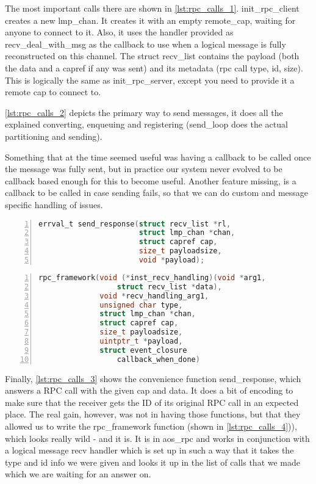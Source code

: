 The most important calls there are shown in \autoref{lst:rpc_calls_1}.
init\_rpc\_client creates a new lmp\_chan. It 
creates it with an empty remote\_cap, waiting for anyone to connect to it. 
Also, it uses the handler provided as recv\_deal\_with\_msg as the callback to 
use when a logical message is fully reconstructed on this channel. The struct 
recv\_list contains the payload (both the data and a capref if any was sent) 
and its metadata (rpc call type, id, size).
This is logically the same as init\_rpc\_server, except you need to provide 
it a remote cap to connect to.
\medskip

\autoref{lst:rpc_calls_2} depicts the primary way to send messages, it does 
all the explained converting, enqueuing and registering (send\_loop does the 
actual partitioning and sending).
\medskip

Something that at the time seemed useful was having a callback to be called 
once the message was fully sent, but in practice our system never evolved to 
be callback based enough for this to become useful. 
Another feature missing, is a callback to be called in case sending fails, so 
that we can do custom and message specific handling of issues.
\medskip

\begin{lstlisting}[caption={RPC send\_response}, 
label=lst:rpc_calls_3, numbers=left, stepnumber=1, float, floatplacement=tl, 
frame=tb, language=c]
errval_t send_response(struct recv_list *rl, 
                       struct lmp_chan *chan,
                       struct capref cap, 
                       size_t payloadsize, 
                       void *payload);
\end{lstlisting}
\begin{lstlisting}[caption={rpc\_framework}, 
label=lst:rpc_calls_4, numbers=left, stepnumber=1, float, floatplacement=tl, 
frame=tb, language=c]
rpc_framework(void (*inst_recv_handling)(void *arg1, 
                  struct recv_list *data),
              void *recv_handling_arg1,
              unsigned char type,
              struct lmp_chan *chan, 
              struct capref cap, 
              size_t payloadsize, 
              uintptr_t *payload,
              struct event_closure 
                  callback_when_done)
\end{lstlisting}

Finally, \autoref{lst:rpc_calls_3} shows the convenience function 
send\_response, which answers a RPC call with the given cap and data. It does 
a bit of encoding to make sure that the receiver gets the ID of its original 
RPC call in an expected place.
The real gain, however, was not in having those functions, but that they 
allowed us to write the rpc\_framework function (shown in 
\autoref{lst:rpc_calls_4})), which looks really wild - and it is. 
It is in aos\_rpc and works in conjunction with a logical message recv handler 
which is set up in such a way that it takes the type and id info we were given 
and looks it up in the list of calls that we made which we are waiting for an 
answer on.
\medskip

